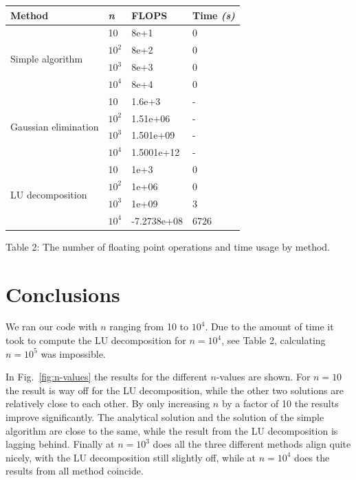 \documentclass{article}
\begin{document}
\begin{multicols}{2}
\begin{center}
    \begin{tabular}{ l  l  l  l } \hline
    \textbf{Method} 					&\textbf{\textit{n}} 	&\textbf{FLOPS} 	&\textbf{Time \textit{(s)}} \\ \hline
    \multirow{4}{*}{Simple algorithm} 		& 10 				& 8e+1			& 0 \\ 
    								& $10^2$  		& 8e+2 			& 0 \\
    								& $10^3$ 			& 8e+3 			& 0 \\ 
								& $10^4$ 			& 8e+4 			& 0 \\
    \hline
    \multirow{4}{*}{Gaussian elimination} 	& 10				& 1.6e+3			& - \\ 
    								& $10^2$  		& 1.51e+06		& - \\
    								& $10^3$ 			& 1.501e+09 		& - \\ 
								& $10^4$ 			& 1.5001e+12 		& - \\ 
    \hline
    \multirow{4}{*}{LU decomposition} 		& 10				& 1e+3			& 0 \\ 
    								& $10^2$ 			& 1e+06			& 0 \\
    								& $10^3$ 			& 1e+09			& 3 \\ 
								& $10^4$ 			& -7.2738e+08		& 6726 \\ 
    \hline
    \end{tabular}
\end{center}

\begin{center}
Table 2: The number of floating point operations and time usage by method.
\end{center}


\section{Conclusions} \label{sec:conclusions}
We ran our code with $n$ ranging from 10 to $10^4$. Due to the amount of time it took to compute the LU decomposition for $n = 10^4$, see Table 2, calculating $n = 10^5$ was impossible. 

In Fig.~\ref{fig:n-values} the results for the different $n$-values are shown. For $n = 10$ the result is way off for the LU decomposition, while the other two solutions are relatively close to each other. By only increasing $n$ by a factor of 10 the results improve significantly. The analytical solution and the solution of the simple algorithm are close to the same, while the result from the LU decomposition is lagging behind. Finally at $n = 10^3$ does all the three different methods align quite nicely, with the LU decomposition still slightly off, while at $n = 10^4$ does the results from all method coincide. 


\end{multicols}
\end{document}
